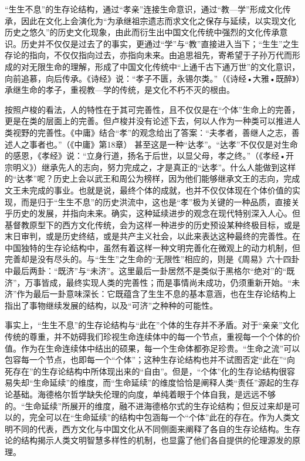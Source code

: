 \documentclass[UTF8, 12pt, a4paper]{ctexrep}
\begin{document}
“生生不息”的生存论结构，通过“孝亲”连接生命意识，通过“教—学”形成文化传承，因此在文化上会演化为“为承继祖宗遗志而求文化之保存与延续，以实现文化历史之悠久”的历史文化现象，由此而衍生出中国文化传统中强烈的文化传承意识。历史并不仅仅是过去了的事实，更通过“学”与“教”直接进入当下；“生生”之生存论的指向，不仅仅指向过去，亦指向未来。由追思祖先，寄希望于子孙万代而形成的对无限生命的理解，形成了中国文化传统中“上通千古下通万世”的文化意识，向前追慕，向后传承。《诗经》说：“孝子不匮，永锡尔类。”（《诗经•大雅•既醉》）承继生命的孝子，重视教—学的传统，是文化不朽不灭的根由。

按照卢梭的看法，人的特性在于其可完善性，且不仅仅是在“个体”生命上的完善，更是在类的层面上的完善。但卢梭并没有论述下去，何以人作为一种类可以推进人类视野的完善性。《中庸》结合“孝”的观念给出了答案：“夫孝者，善继人之志，善述人之事者也。”（《中庸》第18章） 甚至这是一种“达孝”。“达孝”不仅仅是对生命的感恩，《孝经》说：“立身行道，扬名于后世，以显父母，孝之终。”（《孝经•开宗明义》）继承先人的志向，努力完成之，才是真正的“达孝”。什么人能做到这样的“达孝”呢？历史上会以武王和周公为榜样，因为他们能够继承文王的志向，完成文王未完成的事业。也就是说，最终个体的成就，也并不仅仅体现在个体价值的实现，而是归于“生生不息”的历史洪流中，这也是“孝”极为关键的一种品质，直接关乎历史的发展，并指向未来。确实，这种延续进步的观念在现代特别深入人心。但基督教原型下的西方文化传统，会为这样一种进步的历史预设某种终极目标，或是末日审判，或是历史终结，或是共产主义社会，以此来表达这种最终的完善性。在中国独特的生存论结构中，虽然有着这样一种文明完善化在微观上的动力机制，但完善却是没有尽头的。与“生生”之生命的“无限性”相应的，则是《周易》六十四卦中最后两卦：“既济”与“未济”。这里最后一卦居然不是类似于黑格尔“绝对”的“既济”，万事皆成，最终实现人类的完善性；而是事情尚未成功，仍须重新开始。“未济”作为最后一卦意味深长：它既蕴含了生生不息的基本意涵，也在生存论结构上指出了事物继续发展的结构，以及“可济”之种种的可能性。

事实上，“生生不息”的生存论结构与“此在”个体的生存并不矛盾。对于“亲亲”文化传统的尊重，并不妨碍我们珍视生命连续体中的每一个节点，重视每一个个体的价值。作为在生命连续体中结出的硕果，每一个生命体都弥足珍贵。“生命之流”可以包容每一个节点，也即每一个“个体”；这种生存论结构也并不试图否定“此在”“向死存在”的生存论结构中所体现出来的“自由”。但是，“个体”化的生存论结构很容易失却“生命延续”的维度，而“生命延续”的维度恰恰是阐释人类“责任”源起的生存论基础。海德格尔哲学缺失伦理的向度，单纯着眼于个体自我，是远远不够的。“生命延续”所展开的维度，融不进海德格尔式的生存论结构；但反过来却是可以的，完全可以在“生命延续”的结构中包涵每一个“个体”此在的存在。作为人类文明不同的代表，西方文化与中国文化从不同侧面来阐释了各自的生存论结构。生存论的结构揭示人类文明智慧多样性的机制，也显露了他们各自提供的伦理源发的原理。
\end{document}
